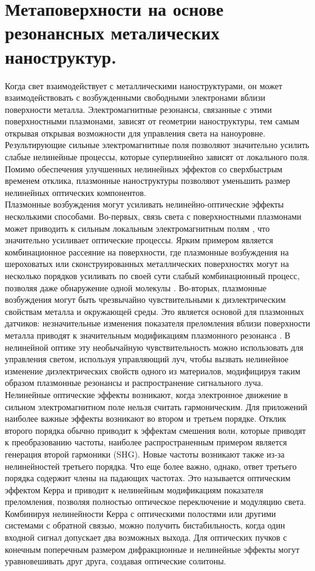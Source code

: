 \section{Метаповерхности на основе резонансных металических наноструктур.}
\hspace*{2mm}
Когда свет взаимодействует с металлическими наноструктурами, он может взаимодействовать с возбужденными свободными электронами вблизи поверхности металла. Электромагнитные резонансы, связанные с этими поверхностными плазмонами, зависят от геометрии наноструктуры, тем самым открывая открывая возможности для управления света на наноуровне. Результирующие сильные электромагнитные поля позволяют значительно усилить слабые нелинейные процессы, которые суперлинейно зависят от локального поля. Помимо обеспечения улучшенных нелинейных эффектов со сверхбыстрым временем отклика, плазмонные наноструктуры позволяют уменьшить размер нелинейных оптических компонентов.
\\
\hspace*{2mm}
Плазмонные возбуждения могут усиливать нелинейно-оптические эффекты несколькими способами. 
Во-первых, связь света с поверхностными плазмонами может приводить к сильным локальным электромагнитным полям \cite{novotny2011antennas}, что значительно усиливает оптические процессы. Ярким примером является комбинационное рассеяние на поверхности, где плазмонные возбуждения на шероховатых или сконструированных металлических поверхностях могут на несколько порядков усиливать по своей сути слабый комбинационный процесс, позволяя даже обнаружение одной молекулы \cite{sharma2012sers}.
Во-вторых, плазмонные возбуждения могут быть чрезвычайно чувствительными к диэлектрическим свойствам металла и окружающей среды. Это является основой для плазмонных датчиков: незначительные изменения показателя преломления вблизи поверхности металла приводят к значительным модификациям плазмонного резонанса \cite{homola2008surface}. В нелинейной оптике эту необычайную чувствительность можно использовать для управления светом, используя управляющий луч, чтобы вызвать нелинейное изменение диэлектрических свойств одного из материалов, модифицируя таким образом плазмонные резонансы и распространение сигнального луча.
\\
\hspace*{2mm}
Нелинейные оптические эффекты возникают, когда электронное движение в сильном электромагнитном поле нельзя считать гармоническим.   Для приложений наиболее важные эффекты возникают во втором и третьем порядке. Отклик второго порядка обычно приводит к эффектам смешения волн, которые приводят к преобразованию частоты, наиболее распространенным примером является генерация второй гармоники (SHG). Новые частоты возникают также из-за нелинейностей третьего порядка. Что еще более важно, однако, ответ третьего порядка содержит члены на падающих частотах. Это называется оптическим эффектом Керра и приводит к нелинейным модификациям показателя преломления, позволяя полностью оптическое переключение и модуляцию света. Комбинируя нелинейности Керра с оптическими полостями или другими системами с обратной связью, можно получить бистабильность, когда один входной сигнал допускает два возможных выхода. Для оптических пучков с конечным поперечным размером дифракционные и нелинейные эффекты могут уравновешивать друг друга, создавая оптические солитоны.

